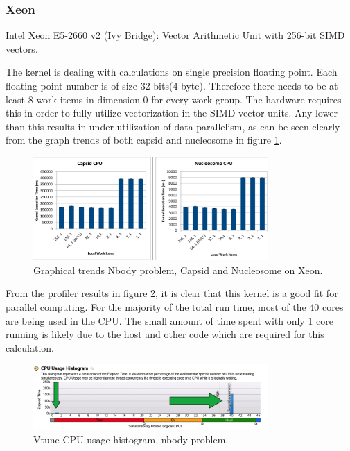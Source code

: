 \subsubsection{Xeon}
\par{Intel Xeon E5-2660 v2 (Ivy Bridge): Vector Arithmetic Unit with 256-bit 
    SIMD vectors.}

\par{The kernel is dealing with calculations on single precision 
    floating point. Each floating point number is of size 32 bits(4 byte). 
    Therefore there needs to be at least 8 work items in dimension 0 for 
    every work group. The hardware requires this in order to fully utilize 
    vectorization in the SIMD vector units. Any lower than this results 
    in under utilization of data parallelism, as can be seen clearly from 
    the graph trends of both capsid and nucleosome in figure \ref{nbody_xeon}.}

\begin{figure}[!h]
    \centering
    \includegraphics[width=0.8\textwidth]{figures/nbody_xeon.png}
    \caption{Graphical trends Nbody problem, Capsid and Nucleosome on Xeon.}
    \label{nbody_xeon}
\end{figure}

\par{From the profiler results in figure \ref{nbody_vtune}, 
    it is clear that this kernel is a good 
    fit for parallel computing. For the majority of the total run time, most 
    of the 40 cores are being used in the CPU. The small amount of time spent 
    with only 1 core running is likely due to the host and other code which 
    are required for this calculation.}

\begin{figure}[!h]
    \centering
    \includegraphics[width=0.8\textwidth]{figures/nbody_vtune.png}
    \caption{Vtune CPU usage histogram, nbody problem.}
    \label{nbody_vtune}
\end{figure}

